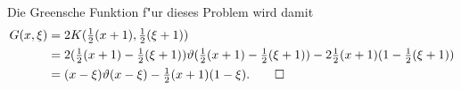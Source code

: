 \begin{loesung}
Die Greensche Funktion f"ur dieses Problem wird damit
\begin{align*}
G(x,\xi)&=
2K({\textstyle\frac12}(x+1),{\textstyle\frac12}(\xi+1))
\\
&=
2
({\textstyle\frac12}(x+1)-\textstyle{\frac12}(\xi+1))
\vartheta({\textstyle\frac12}(x+1)-{\textstyle\frac12}(\xi+1))
-2{\textstyle\frac12}(x+1)(1-{\textstyle\frac12}(\xi+1))
\\
&=
(x-\xi)\vartheta(x-\xi)-{\textstyle\frac12}(x+1)(1-\xi).
\qedhere
\end{align*}
\end{loesung}
